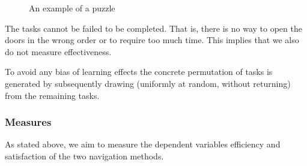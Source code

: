 \documentclass{sig-alternate-05-2015}
\begin{document}
\begin{figure}
\caption{An example of a puzzle}
\end{figure}
The tasks cannot be failed to be completed. That is, there is no way to open the doors in the wrong order or to require too much time. This implies that we also do not measure effectiveness.

To avoid any bias of learning effects
the concrete permutation of tasks is generated by subsequently drawing
(uniformly at random, without returning) from the remaining tasks.

\subsubsection{Measures}
As stated above, we aim to measure the dependent variables efficiency and satisfaction of the two navigation methods. 
\end{document}
